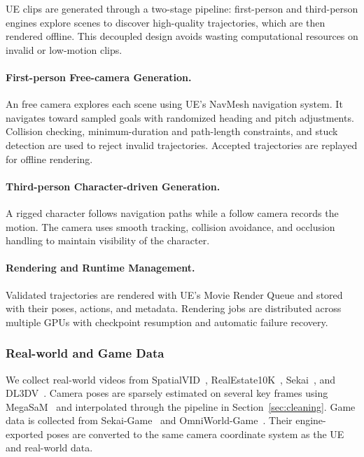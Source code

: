 UE clips are generated through a two-stage pipeline: first-person and third-person engines explore scenes to discover high-quality trajectories, which are then rendered offline. This decoupled design avoids wasting computational resources on invalid or low-motion clips.

\paragraph{\bf{First-person Free-camera Generation.}}
 
An free camera explores each scene using UE's NavMesh navigation system. It navigates toward sampled goals with randomized heading and pitch adjustments. Collision checking, minimum-duration and path-length constraints, and stuck detection are used to reject invalid trajectories. Accepted trajectories are replayed for offline rendering.

\paragraph{\bf{Third-person Character-driven Generation.}}
A rigged character follows navigation paths while a follow camera records the motion. The camera uses smooth tracking, collision avoidance, and occlusion handling to maintain visibility of the character.

\paragraph{\bf{Rendering and Runtime Management.}}
Validated trajectories are rendered with UE's Movie Render Queue and stored with their poses, actions, and metadata. Rendering jobs are distributed across multiple GPUs with checkpoint resumption and automatic failure recovery.

\subsubsection{Real-world and Game Data}
\label{sec:realworld_pipeline}
\label{sec:game_pipeline}

We collect real-world videos from SpatialVID~\citep{wang2025spatialvid}, RealEstate10K~\citep{zhou2018stereo}, Sekai~\citep{li2025sekai}, and DL3DV~\citep{ling2024dl3dv}. Camera poses are sparsely estimated on several key frames using MegaSaM~\citep{li2025megasam} and interpolated through the pipeline in Section~\ref{sec:cleaning}. Game data is collected from Sekai-Game~\citep{li2025sekai} and OmniWorld-Game~\citep{zhou2025omniworld}. Their engine-exported poses are converted to the same camera coordinate system as the UE and real-world data.

